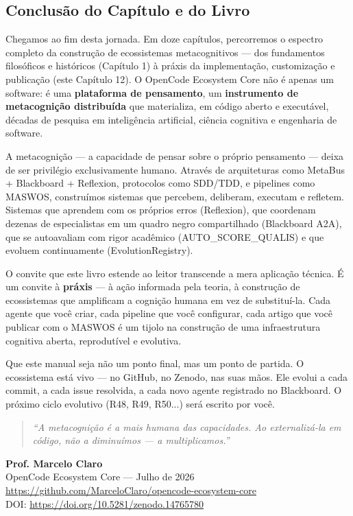 \subsection{Conclusão do Capítulo e do Livro}
\label{sec:conclusao-final}

Chegamos ao fim desta jornada. Em doze capítulos, percorremos o espectro completo da construção de ecossistemas metacognitivos — dos fundamentos filosóficos e históricos (Capítulo 1) à práxis da implementação, customização e publicação (este Capítulo 12). O OpenCode Ecosystem Core não é apenas um software: é uma \textbf{plataforma de pensamento}, um \textbf{instrumento de metacognição distribuída} que materializa, em código aberto e executável, décadas de pesquisa em inteligência artificial, ciência cognitiva e engenharia de software.

A metacognição — a capacidade de pensar sobre o próprio pensamento — deixa de ser privilégio exclusivamente humano. Através de arquiteturas como MetaBus + Blackboard + Reflexion, protocolos como SDD/TDD, e pipelines como MASWOS, construímos sistemas que percebem, deliberam, executam e refletem. Sistemas que aprendem com os próprios erros (Reflexion), que coordenam dezenas de especialistas em um quadro negro compartilhado (Blackboard A2A), que se autoavaliam com rigor acadêmico (AUTO\_SCORE\_QUALIS) e que evoluem continuamente (EvolutionRegistry).

O convite que este livro estende ao leitor transcende a mera aplicação técnica. É um convite à \textbf{práxis} — à ação informada pela teoria, à construção de ecossistemas que amplificam a cognição humana em vez de substituí-la. Cada agente que você criar, cada pipeline que você configurar, cada artigo que você publicar com o MASWOS é um tijolo na construção de uma infraestrutura cognitiva aberta, reprodutível e evolutiva.

Que este manual seja não um ponto final, mas um ponto de partida. O ecossistema está vivo — no GitHub, no Zenodo, nas suas mãos. Ele evolui a cada commit, a cada issue resolvida, a cada novo agente registrado no Blackboard. O próximo ciclo evolutivo (R48, R49, R50...) será escrito por você.

\begin{quote}
\textit{``A metacognição é a mais humana das capacidades. Ao externalizá-la em código, não a diminuímos — a multiplicamos.''}
\end{quote}

\begin{flushright}
\textbf{Prof. Marcelo Claro}\\
OpenCode Ecosystem Core — Julho de 2026\\
\url{https://github.com/MarceloClaro/opencode-ecosystem-core}\\
DOI: \url{https://doi.org/10.5281/zenodo.14765780}
\end{flushright}


